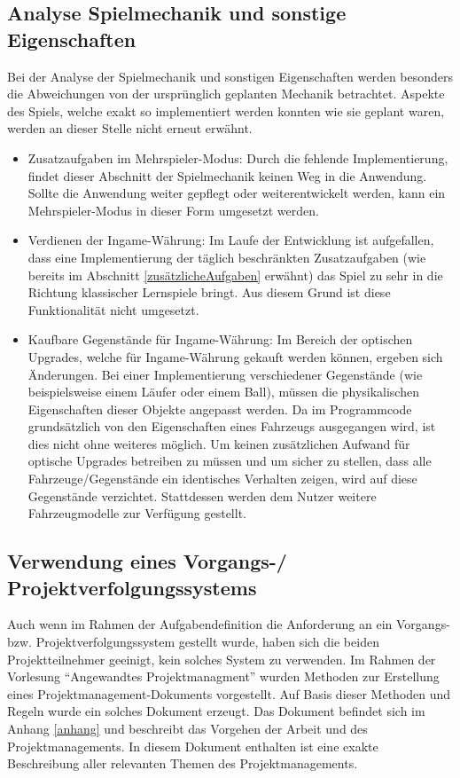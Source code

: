 \subsection{Analyse Spielmechanik und sonstige Eigenschaften}
Bei der Analyse der Spielmechanik und sonstigen Eigenschaften werden besonders die Abweichungen von der ursprünglich geplanten Mechanik betrachtet. Aspekte des Spiels, welche exakt so implementiert werden konnten wie sie geplant waren, werden an dieser Stelle nicht erneut erwähnt.
\begin{itemize}
    \item{Zusatzaufgaben im Mehrspieler-Modus: Durch die fehlende Implementierung, findet dieser Abschnitt der Spielmechanik keinen Weg in die Anwendung. Sollte die Anwendung weiter gepflegt oder weiterentwickelt werden, kann ein Mehrspieler-Modus in dieser Form umgesetzt werden.}
    \item{Verdienen der Ingame-Währung: Im Laufe der Entwicklung ist aufgefallen, dass eine Implementierung der täglich beschränkten Zusatzaufgaben (wie bereits im Abschnitt \ref{zusätzlicheAufgaben} erwähnt) das Spiel zu sehr in die Richtung klassischer Lernspiele bringt. Aus diesem Grund ist diese Funktionalität nicht umgesetzt.}
    \item{Kaufbare Gegenstände für Ingame-Währung: Im Bereich der optischen Upgrades, welche für Ingame-Währung gekauft werden können, ergeben sich Änderungen. Bei einer Implementierung verschiedener Gegenstände (wie beispielsweise einem Läufer oder einem Ball), müssen die physikalischen Eigenschaften dieser Objekte angepasst werden. Da im Programmcode grundsätzlich von den Eigenschaften eines Fahrzeugs ausgegangen wird, ist dies nicht ohne weiteres möglich. Um keinen zusätzlichen Aufwand für optische Upgrades betreiben zu müssen und um sicher zu stellen, dass alle Fahrzeuge/Gegenstände ein identisches Verhalten zeigen, wird auf diese Gegenstände verzichtet. Stattdessen werden dem Nutzer weitere Fahrzeugmodelle zur Verfügung gestellt.}
\end{itemize}

\subsection{Verwendung eines Vorgangs-/ Projektverfolgungssystems}
Auch wenn im Rahmen der Aufgabendefinition die Anforderung an ein Vorgangs- bzw. Projektverfolgungssystem gestellt wurde, haben sich die beiden Projektteilnehmer geeinigt, kein solches System zu verwenden.
Im Rahmen der Vorlesung \enquote{Angewandtes Projektmanagment} wurden Methoden zur Erstellung eines Projektmanagement-Dokuments vorgestellt. Auf Basis dieser Methoden und Regeln wurde ein solches Dokument erzeugt. Das Dokument befindet sich im Anhang \ref{anhang} und beschreibt das Vorgehen der Arbeit und des Projektmanagements. In diesem Dokument enthalten ist eine exakte Beschreibung aller relevanten Themen des Projektmanagements.

